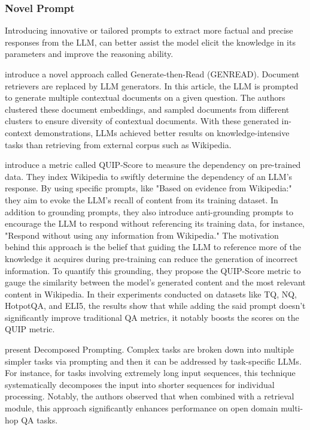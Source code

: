 \subsubsection{Novel Prompt}
\label{sec:enhace_pure_prompt}

Introducing innovative or tailored prompts to extract more factual and precise responses from the LLM, can better assist the model elicit the knowledge in its parameters and improve the reasoning ability.

\citet{yu2023generate} introduce a novel approach called Generate-then-Read (GENREAD). Document retrievers are replaced by LLM generators. In this article, the LLM is prompted to generate multiple  contextual documents on a given question. The authors clustered these document embeddings, and sampled documents from different clusters to ensure diversity of contextual documents. With these generated in-context demonstrations, LLMs achieved better results on knowledge-intensive tasks than retrieving from external corpus such as Wikipedia.

\citet{weller2023according} introduce a metric called QUIP-Score to measure the dependency on pre-trained data. They index Wikipedia to swiftly determine the dependency of an LLM's response. By using specific prompts, like "Based on evidence from Wikipedia:" they aim to evoke the LLM's recall of content from its training dataset. In addition to grounding prompts, they also introduce anti-grounding prompts to encourage the LLM to respond without referencing its training data, for instance, "Respond without using any information from Wikipedia." The motivation behind this approach is the belief that guiding the LLM to reference more of the knowledge it acquires during pre-training can reduce the generation of incorrect information. To quantify this grounding, they propose the QUIP-Score metric to gauge the similarity between the model's generated content and the most relevant content in Wikipedia. In their experiments conducted on datasets like TQ, NQ, HotpotQA, and ELI5, the results show that while adding the said prompt doesn't significantly improve traditional QA metrics, it notably boosts the scores on the QUIP metric.

\citet{khot2023decomposed} present Decomposed Prompting. Complex tasks are broken down into multiple simpler tasks via prompting and then it can be addressed by task-specific LLMs. For instance, for tasks involving extremely long input sequences, this technique systematically decomposes the input into shorter sequences for individual processing. Notably, the authors observed that when combined with a retrieval module, this approach significantly enhances performance on open domain multi-hop QA tasks.

